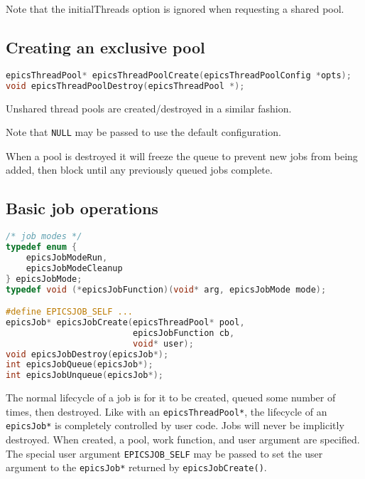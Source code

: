 Note that the initialThreads option is ignored when requesting a shared pool.

\subsection{Creating an exclusive pool}

\begin{lstlisting}[language=C]
epicsThreadPool* epicsThreadPoolCreate(epicsThreadPoolConfig *opts);
void epicsThreadPoolDestroy(epicsThreadPool *);
\end{lstlisting}



Unshared thread pools are created/destroyed in a similar fashion.

Note that \verb|NULL| may be passed to use the default configuration.

When a pool is destroyed it will freeze the queue to prevent new jobs
from being added, then block until any previously queued jobs complete.

\subsection{Basic job operations}

\begin{lstlisting}[language=C]
/* job modes */
typedef enum {
    epicsJobModeRun,
    epicsJobModeCleanup
} epicsJobMode;
typedef void (*epicsJobFunction)(void* arg, epicsJobMode mode);

#define EPICSJOB_SELF ...
epicsJob* epicsJobCreate(epicsThreadPool* pool,
                         epicsJobFunction cb,
                         void* user);
void epicsJobDestroy(epicsJob*);
int epicsJobQueue(epicsJob*);
int epicsJobUnqueue(epicsJob*);
\end{lstlisting}



The normal lifecycle of a job is for it to be created, queued some number of
times, then destroyed. Like with an \verb|epicsThreadPool*|, the lifecycle of
an \verb|epicsJob*| is completely controlled by user code. Jobs will never
be implicitly destroyed. When created, a pool, work function, and
user argument are specified. The special user argument \verb|EPICSJOB_SELF|
may be passed to set the user argument to the \verb|epicsJob*| returned
by \verb|epicsJobCreate()|.

